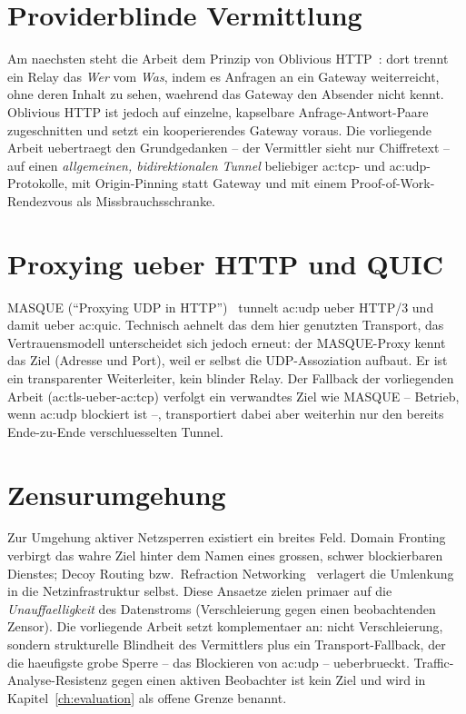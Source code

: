\section{Providerblinde Vermittlung}
\label{sec:rw-ohttp}

Am naechsten steht die Arbeit dem Prinzip von Oblivious
HTTP~\cite{rfc9458}: dort trennt ein Relay das \emph{Wer} vom \emph{Was}, indem
es Anfragen an ein Gateway weiterreicht, ohne deren Inhalt zu sehen, waehrend das
Gateway den Absender nicht kennt. Oblivious HTTP ist jedoch auf einzelne,
kapselbare Anfrage-Antwort-Paare zugeschnitten und setzt ein kooperierendes
Gateway voraus. Die vorliegende Arbeit uebertraegt den Grundgedanken -- der
Vermittler sieht nur Chiffretext -- auf einen \emph{allgemeinen, bidirektionalen
Tunnel} beliebiger \gls{ac:tcp}- und \gls{ac:udp}-Protokolle, mit
Origin-Pinning statt Gateway und mit einem Proof-of-Work-Rendezvous als
Missbrauchsschranke.

\section{Proxying ueber HTTP und QUIC}
\label{sec:rw-masque}

MASQUE (\enquote{Proxying UDP in HTTP})~\cite{rfc9298} tunnelt \gls{ac:udp}
ueber HTTP/3 und damit ueber \gls{ac:quic}. Technisch aehnelt das dem hier
genutzten Transport, das Vertrauensmodell unterscheidet sich jedoch erneut: der
MASQUE-Proxy kennt das Ziel (Adresse und Port), weil er selbst die
UDP-Assoziation aufbaut. Er ist ein transparenter Weiterleiter, kein blinder
Relay. Der Fallback der vorliegenden Arbeit (\gls{ac:tls}-ueber-\gls{ac:tcp})
verfolgt ein verwandtes Ziel wie MASQUE -- Betrieb, wenn \gls{ac:udp} blockiert
ist --, transportiert dabei aber weiterhin nur den bereits Ende-zu-Ende
verschluesselten Tunnel.

\section{Zensurumgehung}
\label{sec:rw-censorship}

Zur Umgehung aktiver Netzsperren existiert ein breites Feld. Domain
Fronting~\cite{fifield2015domain} verbirgt das wahre Ziel hinter dem Namen eines
grossen, schwer blockierbaren Dienstes; Decoy Routing bzw.\ Refraction
Networking~\cite{wustrow2011telex} verlagert die Umlenkung in die
Netzinfrastruktur selbst. Diese Ansaetze zielen primaer auf die
\emph{Unauffaelligkeit} des Datenstroms (Verschleierung gegen einen
beobachtenden Zensor). Die vorliegende Arbeit setzt komplementaer an: nicht
Verschleierung, sondern strukturelle Blindheit des Vermittlers plus ein
Transport-Fallback, der die haeufigste grobe Sperre -- das Blockieren von
\gls{ac:udp} -- ueberbrueckt. Traffic-Analyse-Resistenz gegen einen aktiven
Beobachter ist kein Ziel und wird in Kapitel~\ref{ch:evaluation} als offene
Grenze benannt.

